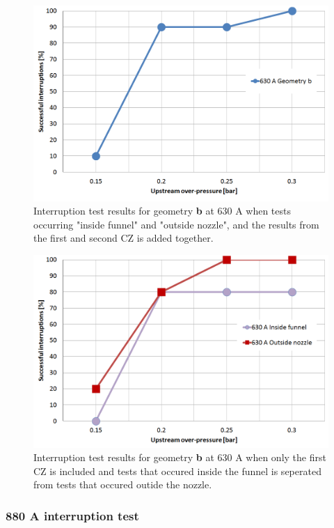 \documentclass[10pt,b5paper,twoside]{article}
\begin{document}
\begin{figure}[H]
\centering
\includegraphics[scale=0.45]{Bilder/Results/geoB630amp.PNG}
\caption{Interruption test results for geometry \textbf{b} at 630 A when tests occurring "inside funnel" and "outside nozzle", and the results from the first and second CZ is added together.} \label{fig:results630AgeoB}
\end{figure}

\begin{figure}[H]
\centering
\includegraphics[scale=0.45]{Bilder/Results/geoB630ampcomp.PNG}
\caption{Interruption test results for geometry \textbf{b} at 630 A when only the first CZ is included and tests that occured inside the funnel is seperated from tests that occured outide the nozzle.} \label{fig:results630AgeoBcomp}
\end{figure}

\subsubsection*{880 A interruption test}
\end{document}
